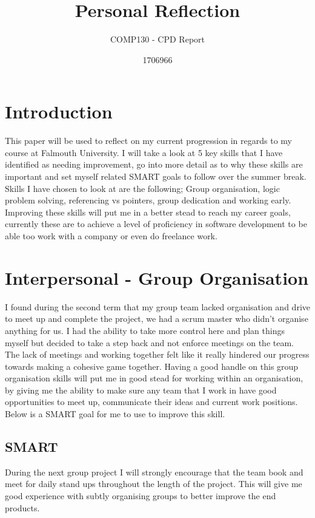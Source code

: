 \documentclass{scrartcl}
\title{Personal Reflection}
\subtitle{COMP130 - CPD Report}
\author{1706966}
\begin{document}
\maketitle

\section{Introduction}

This paper will be used to reflect on my current progression in regards to my course at Falmouth University. I will take a look at 5 key skills that I have identified as needing improvement, go into more detail as to why these skills are important and set myself related SMART goals to follow over the summer break. Skills I have chosen to look at are the following; Group organisation, logic problem solving, referencing vs pointers, group dedication and working early. Improving these skills will put me in a better stead to reach my career goals, currently these are to achieve a level of proficiency in software development to be able too work with a company or even do freelance work.

\section{Interpersonal - Group Organisation}

I found during the second term that my group team lacked organisation and drive to meet up and complete the project, we had a scrum master who didn't organise anything for us. I had the ability to take more control here and plan things myself but decided to take a step back and not enforce meetings on the team. The lack of meetings and working together felt like it really hindered our progress towards making a cohesive game together. Having a good handle on this group organisation skills will put me in good stead for working within an organisation, by giving me the ability to make sure any team that I work in have good opportunities to meet up, communicate their ideas and current work positions. Below is a SMART goal for me to use to improve this skill.
\subsection{SMART}
During the next group project I will strongly encourage that the team book and meet for daily stand ups throughout the length of the project. This will give me good experience with subtly  organising groups to better improve the end products.
\end{document}
